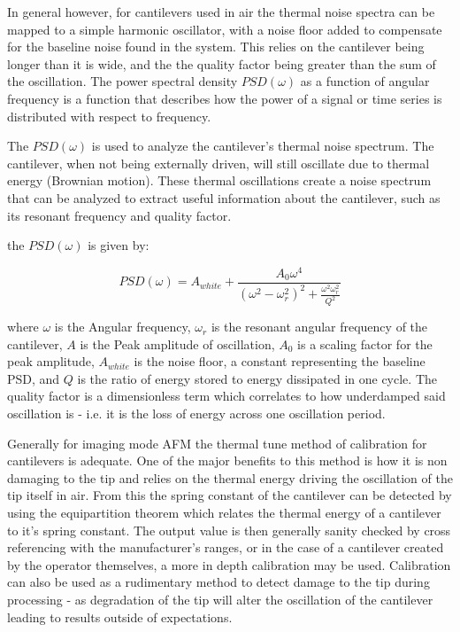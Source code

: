 In general however, for cantilevers used in air the thermal noise spectra can be mapped to a simple harmonic oscillator, with a noise floor added to compensate for the baseline noise found in the system. This relies on the cantilever being longer than it is wide, and the the quality factor being greater than the sum of the oscillation. The power spectral density $PSD(\omega)$ as a function of angular frequency is a function that describes how the power of a signal or time series is distributed with respect to frequency.

The $PSD(\omega)$ is used to analyze the cantilever's thermal noise spectrum. The cantilever, when not being externally driven, will still oscillate due to thermal energy (Brownian motion). These thermal oscillations create a noise spectrum that can be analyzed to extract useful information about the cantilever, such as its resonant frequency and quality factor.

the $PSD(\omega)$ is given by:

\begin{equation}
PSD(\omega) = A_{white} + \frac{A_0 \omega^4}{(\omega^2 - \omega^2_r)^2 + \frac{\omega^2 \omega^2_r}{Q^2}}
\end{equation}

where $\omega$ is the Angular frequency, $\omega_r$ is the resonant angular frequency of the cantilever, $A$ is the Peak amplitude of oscillation, $A_0$ is a scaling factor for the peak amplitude, $A_{white}$ is the noise floor, a constant representing the baseline PSD, and $Q$ is the ratio of energy stored to energy dissipated in one cycle. The quality factor is a dimensionless term which correlates to how underdamped said oscillation is - i.e. it is the loss of energy across one oscillation period. 

Generally for imaging mode AFM the thermal tune method of calibration for cantilevers is adequate. One of the major benefits to this method is how it is non damaging to the tip and relies on the thermal energy driving the oscillation of the tip itself in air. From this the spring constant of the cantilever can be detected by using the equipartition theorem which relates the thermal energy of a cantilever to it's spring constant. The output value is then generally sanity checked by cross referencing with the manufacturer's ranges, or in the case of a cantilever created by the operator themselves, a more in depth calibration may be used. Calibration can also be used as a rudimentary method to detect damage to the tip during processing - as degradation of the tip will alter the oscillation of the cantilever leading to results outside of expectations. 

